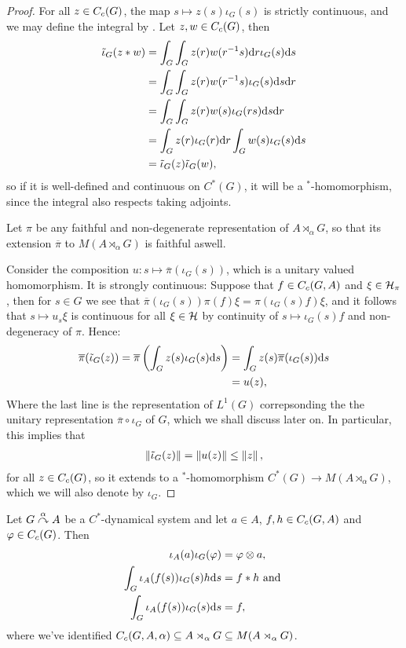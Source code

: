 \begin{proof}
	For all $z \in C_c(G)$, the map $s \mapsto z(s) \iota_G(s)$ is strictly continuous, and we may define the integral by . Let $z,w \in C_c(G)$, then
	\begin{align*}
		\tilde \iota_G(z \ast w) &= \int_G \int_G z(r)w(r^{-1}s) \mathrm{d} r \iota_G(s) \mathrm{d} s \\
		&= \int_G \int_G z(r) w(r^{-1}s) \iota_G(s) \mathrm{d} s \mathrm{d} r\\
		&= \int_G \int_G z(r) w(s) \iota_G(rs) \mathrm{d} s \mathrm{d} r\\
		&= \int_G z(r) \iota_G(r) \mathrm{d} r \int_G w(s) \iota_G(s) \mathrm{d} s \\
		&= \tilde \iota_G(z) \tilde \iota_G(w),
	\end{align*}
	so if it is well-defined and continuous on $C^*(G)$, it will be a $^*$-homomorphism, since the integral also respects taking adjoints. 
	
	Let $\pi$ be any faithful and non-degenerate representation of $A \rtimes_\alpha G$, so that its extension $\overline \pi $ to $M(A \rtimes_ \alpha G)$ is faithful aswell.
	
	Consider the composition $u \colon s \mapsto \overline{\pi}( \iota_G(s))$, which is a unitary valued homomorphism. It is strongly continuous: Suppose that $f \in C_c(G,A)$ and $\xi \in \mathcal{H}_\pi$, then for $s \in G$ we see that $\overline{ \pi} (\iota_G(s)) \pi(f) \xi = \pi(\iota_G(s) f) \xi$, and it follows that  $s \mapsto u_s \xi$ is continuous for all $\xi \in \mathcal{H}$ by continuity of $s \mapsto \iota_G(s)f$ and non-degeneracy of $\pi$. Hence:
	\begin{align*}
	\overline \pi(\tilde \iota_G(z)) = \overline \pi \left(  \int_G z(s) \iota_G(s) \mathrm{d} s \right) &=\int_G z(s) \overline \pi(\iota_G(s)) \mathrm{d} s \\
	&= u(z),
	\end{align*}
	Where the last line is the representation of $L^1(G)$ correpsonding the the unitary representation $\overline \pi \circ \iota_G$ of $G$, which we shall discuss later on. In particular, this implies that
	\begin{align}
		\left\lVert \tilde \iota_G(z)\right\rVert = \left\lVert u(z)\right\rVert \leq \left\lVert z \right\rVert,
	\end{align}
	for all $z \in C_c(G)$, so it extends to a $^*$-homomorphism $C^*(G) \to M(A \rtimes_\alpha G)$, which we will also denote by $\iota_G$.
\end{proof}
\begin{corollary}
	Let $G \stackrel{\alpha}{\curvearrowright} A$ be a $C^*$-dynamical system and let $a \in A$, $f,h \in C_c(G,A)$ and $\varphi \in C_c(G)$. Then
\begin{align*}
	\iota_A(a) \iota_G(\varphi) &= \varphi \otimes a,\\
	\int_G \iota_A(f(s)) \iota_G(s)h  \mathrm{d} s &= f \ast h \text{ and }\\
	\int_G \iota_A(f(s)) \iota_G(s) \mathrm{d} s & = f,
\end{align*}
where we've identified $C_c(G,A,\alpha) \subseteq A \rtimes_\alpha G \subseteq M(A \rtimes_\alpha G)$.
	\label{cross:iotaresults}
\end{corollary}
